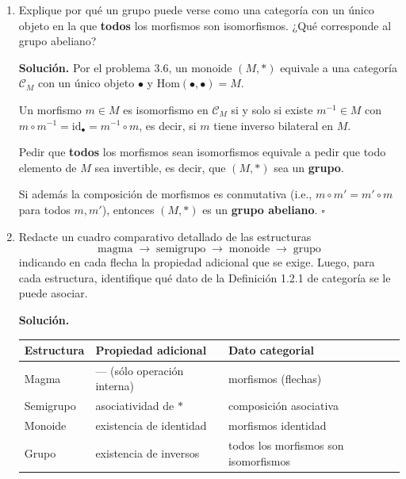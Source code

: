 \begin{enumerate}[label=\textbf{4.\arabic*.}]

\item Explique por qué un grupo puede verse como una categoría con un único objeto
en la que \textbf{todos} los morfismos son isomorfismos. ¿Qué corresponde al
grupo abeliano?

\textbf{Solución.}
Por el problema 3.6, un monoide \((M,*)\) equivale a una categoría \(\mathcal{C}_M\)
con un único objeto \(\bullet\) y \(\mathrm{Hom}(\bullet,\bullet)=M\).

Un morfismo \(m \in M\) es isomorfismo en \(\mathcal{C}_M\) si y solo si existe
\(m^{-1} \in M\) con \(m \circ m^{-1} = \mathrm{id}_\bullet = m^{-1} \circ m\),
es decir, si \(m\) tiene inverso bilateral en \(M\).

Pedir que \textbf{todos} los morfismos sean isomorfismos equivale a pedir que todo
elemento de \(M\) sea invertible, es decir, que \((M,*)\) sea un \textbf{grupo}.

Si además la composición de morfismos es conmutativa (i.e., \(m\circ m'=m'\circ m\)
para todos \(m,m'\)), entonces \((M,*)\) es un \textbf{grupo abeliano}. \hfill\(\square\)

\item Redacte un cuadro comparativo detallado de las estructuras
\[
    \text{magma} \;\to\; \text{semigrupo} \;\to\; \text{monoide} \;\to\; \text{grupo}
\]
indicando en cada flecha la propiedad adicional que se exige. Luego, para cada
estructura, identifique qué dato de la Definición 1.2.1 de categoría se le puede
asociar.

\textbf{Solución.}

\begin{center}
\begin{tabular}{lll}
\hline
\textbf{Estructura} & \textbf{Propiedad adicional} & \textbf{Dato categorial} \\
\hline
Magma & --- (sólo operación interna) & morfismos (flechas) \\
Semigrupo & asociatividad de \(*\) & composición asociativa \\
Monoide & existencia de identidad & morfismos identidad \\
Grupo & existencia de inversos & todos los morfismos son isomorfismos \\
\hline
\end{tabular}
\end{center}


\end{enumerate}
